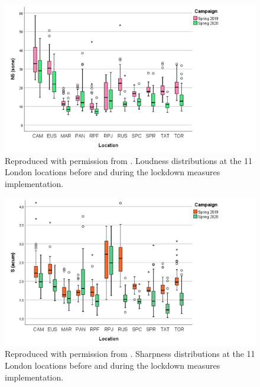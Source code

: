 
\begin{figure}[h]
  \centering
  \includegraphics[width=.75\textwidth]{Figures/NoiseMappingLockdown Fig 4.png}
  \caption{Reproduced with permission from \citet{Aletta2020Assessing}. Loudness distributions at the 11 London locations before and during the lockdown measures implementation. \label{fig:NsMapLockN5}}

\end{figure}


\begin{figure}[h]
  \centering
  \includegraphics[width=.75\textwidth]{Figures/NoiseMappingLockdown Fig 5.png}
  \caption{Reproduced with permission from \citet{Aletta2020Assessing}. Sharpness distributions at the 11 London locations before and during the lockdown measures implementation. \label{fig:NsMapLockS}}

\end{figure}



